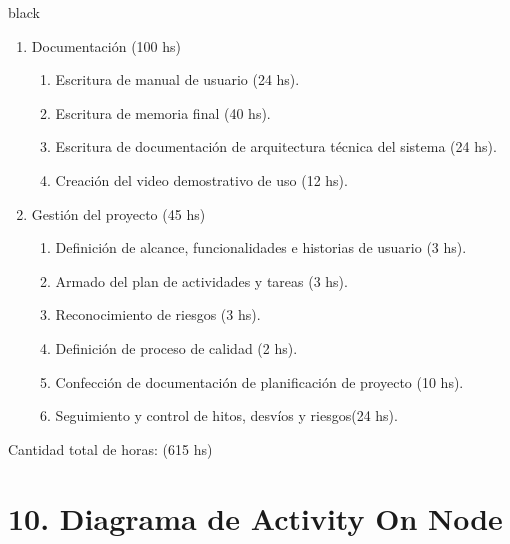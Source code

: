 \documentclass[
11pt, %
]{charter}
\begin{document}
\begin{consigna}{black}
\begin{enumerate}
\item Documentación (100 hs)
	\begin{enumerate}				
	\item Escritura de manual de usuario (24 hs).			
	\item Escritura de memoria final (40 hs).
	\item Escritura de documentación de arquitectura técnica del sistema (24 hs).		
	\item Creación del video demostrativo de uso (12 hs).				
	\end{enumerate}	


\item Gestión del proyecto (45 hs)
	\begin{enumerate}
	\item Definición de alcance, funcionalidades e historias de usuario (3 hs).	
	\item Armado del plan de actividades y tareas (3 hs).
	\item Reconocimiento de riesgos (3 hs).
	\item Definición de proceso de calidad (2 hs).
	\item Confección de documentación de planificación de proyecto (10 hs).
	\item Seguimiento y control de hitos, desvíos y riesgos(24 hs).	
	\end{enumerate}
		
\end{enumerate}

Cantidad total de horas: (615 hs)

\end{consigna}

\section{10. Diagrama de Activity On Node}
\label{sec:AoN}
\end{document}
